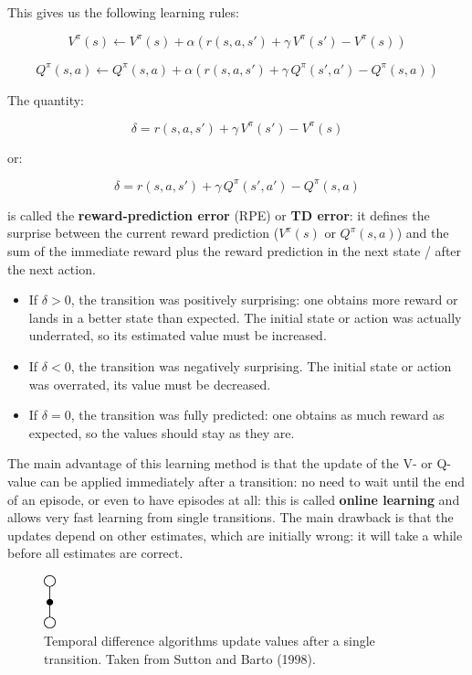 \documentclass[
  letterpaper,
  DIV=11,
  numbers=noendperiod]{scrreprt}
\providecommand{\tightlist}{%
  \setlength{\itemsep}{0pt}\setlength{\parskip}{0pt}}\usepackage{longtable,booktabs,array}
\begin{document}
This gives us the following learning rules:

\[
    V^\pi(s) \leftarrow V^\pi(s) + \alpha (r(s, a, s') + \gamma \, V^\pi(s') - V^\pi(s))
\]

\[
    Q^\pi(s, a) \leftarrow Q^\pi(s, a) + \alpha (r(s, a, s') + \gamma \, Q^\pi(s', a') - Q^\pi(s, a))
\]

The quantity:

\[
 \delta = r(s, a, s') + \gamma \, V^\pi(s') - V^\pi(s)
\]

or:

\[
    \delta = r(s, a, s') + \gamma \, Q^\pi(s', a') - Q^\pi(s, a)
\]

is called the \textbf{reward-prediction error} (RPE) or \textbf{TD
error}: it defines the surprise between the current reward prediction
(\(V^\pi(s)\) or \(Q^\pi(s, a)\)) and the sum of the immediate reward
plus the reward prediction in the next state / after the next action.

\begin{itemize}
\tightlist
\item
  If \(\delta > 0\), the transition was positively surprising: one
  obtains more reward or lands in a better state than expected. The
  initial state or action was actually underrated, so its estimated
  value must be increased.
\item
  If \(\delta < 0\), the transition was negatively surprising. The
  initial state or action was overrated, its value must be decreased.
\item
  If \(\delta = 0\), the transition was fully predicted: one obtains as
  much reward as expected, so the values should stay as they are.
\end{itemize}

The main advantage of this learning method is that the update of the V-
or Q-value can be applied immediately after a transition: no need to
wait until the end of an episode, or even to have episodes at all: this
is called \textbf{online learning} and allows very fast learning from
single transitions. The main drawback is that the updates depend on
other estimates, which are initially wrong: it will take a while before
all estimates are correct.

\begin{figure}

{\centering \includegraphics[width=0.03\textwidth,height=\textheight]{./img/backup-TD.png}

}

\caption{\label{fig-td}Temporal difference algorithms update values
after a single transition. Taken from Sutton and Barto (1998).}

\end{figure}
\end{document}
